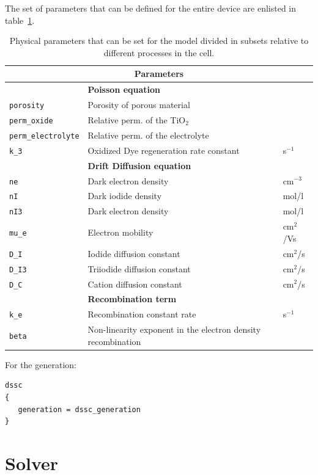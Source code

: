 The set of parameters that can be defined for the entire device
are enlisted in table~\ref{table:dsc_parameters}.
\begin{table}[!htb]
\center
\begin{tabular}{l|p{8cm}|l}
\multicolumn{3}{c}{\textbf{Parameters}} \\
\hline
 & \textbf{Poisson equation} & \\
\hline
\texttt{porosity} & Porosity of porous material &  \\
\texttt{perm\_oxide} & Relative perm. of the TiO$_2$ &  \\
\texttt{perm\_electrolyte} & Relative perm. of the electrolyte & \\
\texttt{k\_3} & Oxidized Dye regeneration rate constant & s$^{-1}$ \\
\hline
 & \textbf{Drift Diffusion equation} & \\
\hline
\texttt{ne} & Dark electron density & cm$^{-3}$ \\
\texttt{nI} & Dark iodide density & mol/l \\
\texttt{nI3} & Dark electron density & mol/l \\
\texttt{mu\_e} & Electron mobility & cm$^{2}$/Vs \\
\texttt{D\_I} & Iodide diffusion constant & cm$^{2}$/s \\
\texttt{D\_I3} & Triiodide diffusion constant & cm$^{2}$/s \\
\texttt{D\_C} & Cation diffusion constant & cm$^{2}$/s \\
\hline
 & \textbf{Recombination term} & \\
\hline
\texttt{k\_e} & Recombination constant rate & s$^{-1}$ \\
\texttt{beta} & Non-linearity exponent in the electron density recombination &  \\
\end{tabular}
\caption{Physical parameters that can be set for the model divided
in subsets relative to different processes in the cell.}
\label{table:dsc_parameters}
\end{table}
For the generation:
\begin{verbatim}
dssc
{
   generation = dssc_generation
}
\end{verbatim}



\section{Solver}

